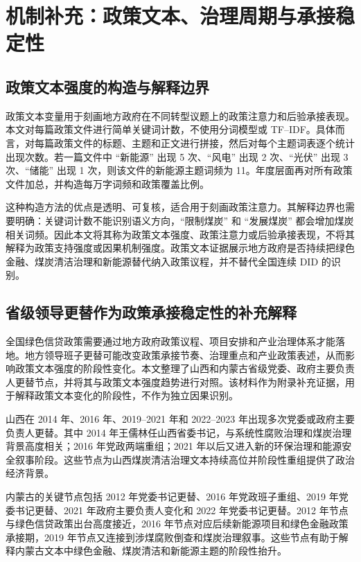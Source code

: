\documentclass[UTF8,12pt]{ctexart}
\begin{document}
\section{机制补充：政策文本、治理周期与承接稳定性}

\subsection{政策文本强度的构造与解释边界}

政策文本变量用于刻画地方政府在不同转型议题上的政策注意力和后验承接表现。本文对每篇政策文件进行简单关键词计数，不使用分词模型或 TF--IDF。具体而言，对每篇政策文件的标题、主题和正文进行拼接，然后对每个主题词表逐个统计出现次数。若一篇文件中 ``新能源'' 出现 5 次、``风电'' 出现 2 次、``光伏'' 出现 3 次、``储能'' 出现 1 次，则该文件的新能源主题词频为 11。年度层面再对所有政策文件加总，并构造每万字词频和政策覆盖比例。

这种构造方法的优点是透明、可复核，适合用于刻画政策注意力。其解释边界也需要明确：关键词计数不能识别语义方向，``限制煤炭'' 和 ``发展煤炭'' 都会增加煤炭相关词频。因此本文将其称为政策文本强度、政策注意力或后验承接表现，不将其解释为政策支持强度或因果机制强度。政策文本证据展示地方政府是否持续把绿色金融、煤炭清洁治理和新能源替代纳入政策议程，并不替代全国连续 DID 的识别。

\subsection{省级领导更替作为政策承接稳定性的补充解释}

全国绿色信贷政策需要通过地方政府政策议程、项目安排和产业治理体系才能落地。地方领导班子更替可能改变政策承接节奏、治理重点和产业政策表述，从而影响政策文本强度的阶段性变化。本文整理了山西和内蒙古省级党委、政府主要负责人更替节点，并将其与政策文本强度趋势进行对照。该材料作为附录补充证据，用于解释政策文本变化的阶段性，不作为独立因果识别。

山西在 2014 年、2016 年、2019--2021 年和 2022--2023 年出现多次党委或政府主要负责人更替。其中 2014 年王儒林任山西省委书记，与系统性腐败治理和煤炭治理背景高度相关；2016 年党政两端重组；2021 年以后又进入新的环保治理和能源安全叙事阶段。这些节点为山西煤炭清洁治理文本持续高位并阶段性重组提供了政治经济背景。

内蒙古的关键节点包括 2012 年党委书记更替、2016 年党政班子重组、2019 年党委书记更替、2021 年政府主要负责人变化和 2022 年党委书记更替。2012 年节点与绿色信贷政策出台高度接近，2016 年节点对应后续新能源项目和绿色金融政策承接期，2019 年节点又连接到涉煤腐败倒查和煤炭治理叙事。这些节点有助于解释内蒙古文本中绿色金融、煤炭清洁和新能源主题的阶段性抬升。
\end{document}
